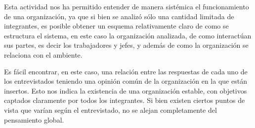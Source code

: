 
Esta actividad nos ha permitido entender de manera sistémica el funcionamiento de una organización,
ya que si bien se analizó sólo una cantidad limitada de integrantes, es posible obtener un 
esquema relativamente claro de como se estructura el sistema, en este caso la organización 
analizada, de como interactúan sus partes, es decir los trabajadores y jefes, y además de como la 
organización se relaciona con el ambiente.

Es fácil encontrar, en este caso, una relación entre las respuestas de cada uno de los entrevistados
teniendo una opinión común de la organización en la que están insertos. Esto nos indica
la existencia de una organización estable, con objetivos captados claramente por todos los integrantes. Si
bien existen ciertos puntos de vista que varían según el entrevistado, no se alejan completamente del
pensamiento global.
